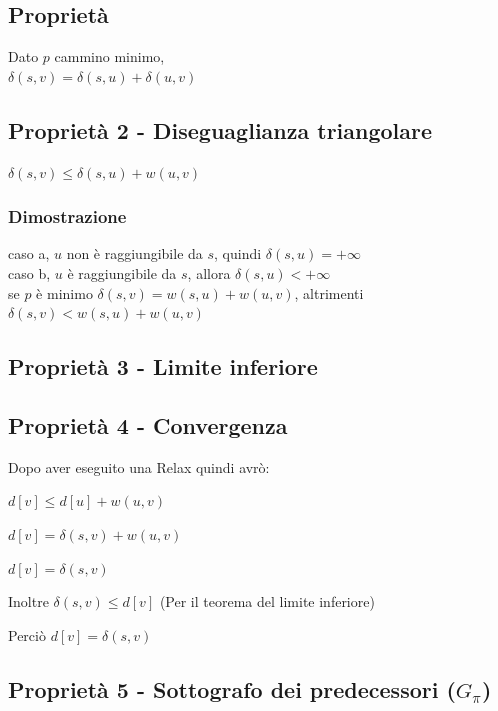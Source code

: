 \documentclass[tikz]{article}
\begin{document}
{{\subsection{Proprietà}

Dato $p$ cammino minimo, \\
$\delta(s,v)=\delta(s,u)+\delta(u,v)$ \\


\subsection{Proprietà 2 - Diseguaglianza triangolare}

$\delta(s,v)\leq \delta(s,u)+w(u,v)$ \\

\subsubsection{Dimostrazione}

caso a, $u$ non è raggiungibile da $s$, quindi $\delta(s,u) = +\infty$ \\
caso b, $u$ è raggiungibile da $s$, allora $\delta(s,u) < +\infty$ \\

se $p$ è minimo $\delta(s,v)=w(s,u)+w(u,v)$, altrimenti $\delta(s,v)<w(s,u)+w(u,v)$ \\


\subsection{Proprietà 3 - Limite inferiore}

\subsection{Proprietà 4 - Convergenza}

{Dopo aver eseguito una Relax quindi avrò:}

$d[v] \leq d[u] + w(u,v)$

$d[v] = \delta(s,v) + w(u,v)$

$d[v] = \delta(s,v)$ 

Inoltre $\delta(s,v) \leq d[v]$ (Per il teorema del limite inferiore)

Perciò $d[v]=\delta(s,v)$

\subsection{Proprietà 5 - Sottografo dei predecessori ($G_\pi$)}

}}
\end{document}
